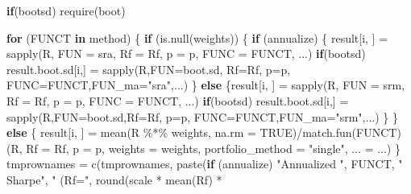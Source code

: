 \documentclass[
]{article}
\newenvironment{Shaded}{\begin{snugshade}}{\end{snugshade}}
\newcommand{\AttributeTok}[1]{\textcolor[rgb]{0.77,0.63,0.00}{#1}}
\newcommand{\ConstantTok}[1]{\textcolor[rgb]{0.00,0.00,0.00}{#1}}
\newcommand{\ControlFlowTok}[1]{\textcolor[rgb]{0.13,0.29,0.53}{\textbf{#1}}}
\newcommand{\FunctionTok}[1]{\textcolor[rgb]{0.00,0.00,0.00}{#1}}
\newcommand{\NormalTok}[1]{#1}
\newcommand{\OtherTok}[1]{\textcolor[rgb]{0.56,0.35,0.01}{#1}}
\newcommand{\SpecialCharTok}[1]{\textcolor[rgb]{0.00,0.00,0.00}{#1}}
\newcommand{\StringTok}[1]{\textcolor[rgb]{0.31,0.60,0.02}{#1}}
\begin{document}
\begin{Shaded}
\begin{Highlighting}[]
    \ControlFlowTok{if}\NormalTok{(bootsd) }\FunctionTok{require}\NormalTok{(boot)}
    
    \ControlFlowTok{for}\NormalTok{ (FUNCT }\ControlFlowTok{in}\NormalTok{ method) \{}
        \ControlFlowTok{if}\NormalTok{ (}\FunctionTok{is.null}\NormalTok{(weights)) \{}
            \ControlFlowTok{if}\NormalTok{ (annualize) \{}
\NormalTok{                result[i, ] }\OtherTok{=} \FunctionTok{sapply}\NormalTok{(R, }\AttributeTok{FUN =}\NormalTok{ sra, }\AttributeTok{Rf =}\NormalTok{ Rf, }\AttributeTok{p =}\NormalTok{ p, }\AttributeTok{FUNC =}\NormalTok{ FUNCT, ...)}
            \ControlFlowTok{if}\NormalTok{(bootsd)}
\NormalTok{                result.boot.sd[i,] }\OtherTok{=} \FunctionTok{sapply}\NormalTok{(R,}\AttributeTok{FUN=}\NormalTok{boot.sd, }\AttributeTok{Rf=}\NormalTok{Rf, }\AttributeTok{p=}\NormalTok{p, }\AttributeTok{FUNC=}\NormalTok{FUNCT,}\AttributeTok{FUN\_ma=}\StringTok{"sra"}\NormalTok{,...)}
\NormalTok{        \}}
            \ControlFlowTok{else}\NormalTok{ \{result[i, ] }\OtherTok{=} \FunctionTok{sapply}\NormalTok{(R, }\AttributeTok{FUN =}\NormalTok{ srm, }\AttributeTok{Rf =}\NormalTok{ Rf, }
                        \AttributeTok{p =}\NormalTok{ p, }\AttributeTok{FUNC =}\NormalTok{ FUNCT, ...)}
                \ControlFlowTok{if}\NormalTok{(bootsd)}
\NormalTok{                    result.boot.sd[i,] }\OtherTok{=} \FunctionTok{sapply}\NormalTok{(R,}\AttributeTok{FUN=}\NormalTok{boot.sd,}\AttributeTok{Rf=}\NormalTok{Rf, }\AttributeTok{p=}\NormalTok{p, }\AttributeTok{FUNC=}\NormalTok{FUNCT,}\AttributeTok{FUN\_ma=}\StringTok{"srm"}\NormalTok{,...)}
\NormalTok{            \}}
\NormalTok{        \}}
        \ControlFlowTok{else}\NormalTok{ \{}
\NormalTok{            result[i, ] }\OtherTok{=} \FunctionTok{mean}\NormalTok{(R }\SpecialCharTok{\%*\%}\NormalTok{ weights, }\AttributeTok{na.rm =} \ConstantTok{TRUE}\NormalTok{)}\SpecialCharTok{/}\FunctionTok{match.fun}\NormalTok{(FUNCT)(R, }
                    \AttributeTok{Rf =}\NormalTok{ Rf, }\AttributeTok{p =}\NormalTok{ p, }\AttributeTok{weights =}\NormalTok{ weights, }\AttributeTok{portfolio\_method =} \StringTok{"single"}\NormalTok{, }
                    \AttributeTok{... =}\NormalTok{ ...)}
\NormalTok{        \}}
\NormalTok{        tmprownames }\OtherTok{=} \FunctionTok{c}\NormalTok{(tmprownames, }\FunctionTok{paste}\NormalTok{(}\ControlFlowTok{if}\NormalTok{ (annualize) }\StringTok{"Annualized "}\NormalTok{, }
\NormalTok{                        FUNCT, }\StringTok{" Sharpe"}\NormalTok{, }\StringTok{" (Rf="}\NormalTok{, }\FunctionTok{round}\NormalTok{(scale }\SpecialCharTok{*} \FunctionTok{mean}\NormalTok{(Rf) }\SpecialCharTok{*} 

\end{Highlighting}
\end{Shaded}
\end{document}
